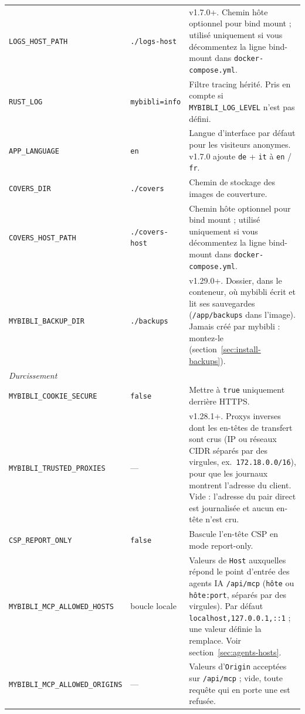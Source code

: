 {\begin{longtable}{l l >{\raggedright\arraybackslash}p{6.2cm}}
\texttt{LOGS\_HOST\_PATH}     & \texttt{./logs-host} & v1.7.0+. Chemin hôte optionnel pour bind mount ; utilisé uniquement si vous décommentez la ligne bind-mount dans \texttt{docker-compose.yml}. \\
\texttt{RUST\_LOG}            & \texttt{mybibli=info} & Filtre tracing hérité. Pris en compte si \texttt{MYBIBLI\_LOG\_LEVEL} n'est pas défini. \\
\texttt{APP\_LANGUAGE}        & \texttt{en}     & Langue d'interface par défaut pour les visiteurs anonymes. v1.7.0 ajoute \texttt{de} + \texttt{it} à \texttt{en} / \texttt{fr}. \\
\texttt{COVERS\_DIR}          & \texttt{./covers} & Chemin de stockage des images de couverture. \\
\texttt{COVERS\_HOST\_PATH}   & \texttt{./covers-host} & Chemin hôte optionnel pour bind mount ; utilisé uniquement si vous décommentez la ligne bind-mount dans \texttt{docker-compose.yml}. \\
\texttt{MYBIBLI\_BACKUP\_DIR} & \texttt{./backups} & v1.29.0+. Dossier, dans le conteneur, où mybibli écrit et lit ses sauvegardes (\texttt{/app/backups} dans l'image). Jamais créé par mybibli : montez-le (section~\ref{sec:install-backups}). \\
\midrule
\multicolumn{3}{l}{\emph{Durcissement}} \\
\texttt{MYBIBLI\_COOKIE\_SECURE} & \texttt{false} & Mettre à \texttt{true} uniquement derrière HTTPS. \\
\texttt{MYBIBLI\_TRUSTED\_PROXIES} & --- & v1.28.1+. Proxys inverses dont les en-têtes de transfert sont crus (IP ou réseaux CIDR séparés par des virgules, ex.\ \texttt{172.18.0.0/16}), pour que les journaux montrent l'adresse du client. Vide : l'adresse du pair direct est journalisée et aucun en-tête n'est cru. \\
\texttt{CSP\_REPORT\_ONLY}     & \texttt{false} & Bascule l'en-tête CSP en mode report-only. \\
\texttt{MYBIBLI\_MCP\_ALLOWED\_HOSTS} & boucle locale & Valeurs de \texttt{Host} auxquelles répond le point d'entrée des agents IA \texttt{/api/mcp} (\texttt{hôte} ou \texttt{hôte:port}, séparés par des virgules). Par défaut \texttt{localhost,127.0.0.1,::1} ; une valeur définie la remplace. Voir section~\ref{sec:agents-hosts}. \\
\texttt{MYBIBLI\_MCP\_ALLOWED\_ORIGINS} & --- & Valeurs d'\texttt{Origin} acceptées sur \texttt{/api/mcp} ; vide, toute requête qui en porte une est refusée. \\

\end{longtable}}
